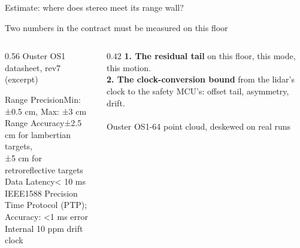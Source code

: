 \documentclass[aspectratio=169, 12pt]{beamer}
\newenvironment{logblock}[1][8.5]{\par\ttfamily\bfseries\fontsize{#1}{#1}\selectfont\setlength{\baselineskip}{1.25\baselineskip}\raggedright\setlength{\parskip}{0pt}}{\par}
\begin{document}
\begin{frame}{Estimate: where does stereo meet its range wall?}
{  


}
\end{frame}

\begin{frame}{Two numbers in the contract must be measured on this floor}
  \begin{columns}[c]
    \begin{column}{0.56\textwidth}
      {\small Ouster OS1 datasheet, rev7 (excerpt)}\par\vspace{0.08cm}
      \begin{logblock}[8.5]
        Range Precision\hfill Min: ±0.5 cm, Max: ±3 cm\\
        Range Accuracy\hfill ±2.5 cm for lambertian targets,\\
        \hfill ±5 cm for retroreflective targets\\
        Data Latency\hfill < 10 ms\\
        IEEE1588 Precision Time Protocol (PTP);\\
        \hfill Accuracy: <1 ms error\\
        Internal 10 ppm drift clock
      \end{logblock}
    \end{column}
    \begin{column}{0.42\textwidth}
      \small\textbf{\textcolor{figveto}{1. The residual tail}} on this floor, this mode, this motion.\\[0.18cm]
      \textbf{\textcolor{figamber}{2. The clock-conversion bound}} from the lidar's clock to the safety MCU's: offset tail, asymmetry, drift.\\[0.18cm]
      \centering{}\\[0.02cm]
      {\scriptsize\textcolor{midgray}{Ouster OS1-64 point cloud, deskewed on real runs}}
    \end{column}
  \end{columns}

\end{frame}
\end{document}
